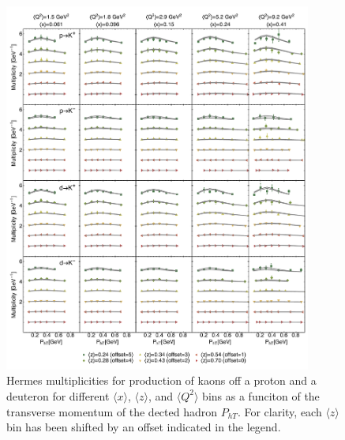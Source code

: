 \documentclass[aps,preprintnumbers,showpacs,nofootinbib,superscriptaddress,floatfix]{revtex4}
\newcommand{\AS}[1]{{\textcolor[rgb]{1,0,1}{#1}}}
\begin{document}
\begin{figure}[h!]
\begin{center}
\includegraphics[width=0.90\textwidth]{plots/Hermes_Kaons_SCIplot_flINDEP.pdf}
\end{center}
\caption{Hermes multiplicities for production of kaons off a proton and a deuteron for different $\langle x \rangle$, $\langle z \rangle$, and $\langle Q^2 \rangle$ bins as a funciton of the transverse momentum of the dected hadron $P_{hT}$. \AS{For clarity, each $\langle z \rangle$  bin has been shifted by an offset indicated in the legend.}} 
\label{f:H_kaons}
\end{figure}
\end{document}
